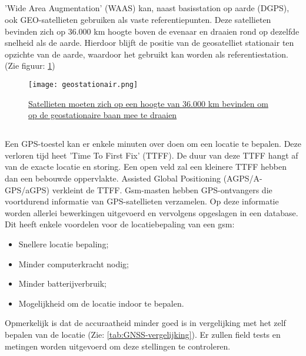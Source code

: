 \subsection{}
'Wide Area Augmentation' (WAAS) kan, naast basisstation op aarde (DGPS), ook GEO-satellieten gebruiken als vaste referentiepunten. Deze satellieten bevinden zich op 36.000 km hoogte boven de evenaar en draaien rond op dezelfde snelheid als de aarde. Hierdoor blijft de positie van de geosatelliet stationair ten opzichte van de aarde, waardoor het gebruikt kan worden als referentiestation.(Zie figuur: \ref{fig:geostationair})
\begin{figure}
	\texttt{[image: geostationair.png]}
	\caption[Geostationair]{\href{https://quizlet.com/393158527/de-kosmische-ruimte-de-ruimtevaart-en-haar-toepassingen-flash-cards/}{Satellieten moeten zich op een hoogte van 36.000 km bevinden om op de geostationaire baan mee te draaien  \autocite{fig_geostationair}}}
	\label{fig:geostationair} 
\end{figure}
\subsection{}
Een GPS-toestel kan er enkele minuten over doen om een locatie te bepalen. Deze verloren tijd heet 'Time To First Fix' (TTFF). De duur van deze TTFF hangt af van de exacte locatie en storing. Een open veld zal een kleinere TTFF hebben dan een bebouwde oppervlakte. Assisted Global Positioning (AGPS/A-GPS/aGPS) verkleint de TTFF. 
\newline
Gsm-masten hebben GPS-ontvangers die voortdurend informatie van GPS-satellieten verzamelen. Op deze informatie worden allerlei bewerkingen uitgevoerd en vervolgens opgeslagen in een database. Dit heeft enkele voordelen voor de locatiebepaling van een gsm:
\begin{itemize}
	\item Snellere locatie bepaling;
	\item Minder computerkracht nodig;
	\item Minder batterijverbruik;
	\item Mogelijkheid om de locatie indoor te bepalen.
\end{itemize} 
Opmerkelijk is dat de accuraatheid minder goed is in vergelijking met het zelf bepalen van de locatie (Zie: \ref{tab:GNSS-vergelijking}). Er zullen field tests en metingen worden uitgevoerd om deze stellingen te controleren. \autocite{agps}
